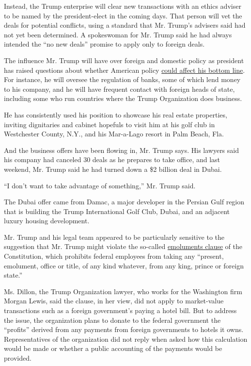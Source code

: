 Instead, the Trump enterprise will clear new transactions with an ethics
adviser to be named by the president-elect in the coming days. That
person will vet the deals for potential conflicts, using a standard that
Mr. Trump's advisers said had not yet been determined. A spokeswoman for
Mr. Trump said he had always intended the ``no new deals'' promise to
apply only to foreign deals.

The influence Mr. Trump will have over foreign and domestic policy as
president has raised questions about whether American policy
\href{http://www.nytimes.com/interactive/2016/12/01/us/politics/trump-conflict-of-interests.html}{could
affect his bottom line}. For instance, he will oversee the regulation of
banks, some of which lend money to his company, and he will have
frequent contact with foreign heads of state, including some who run
countries where the Trump Organization does business.

He has consistently used his position to showcase his real estate
properties, inviting dignitaries and cabinet hopefuls to visit him at
his golf club in Westchester County, N.Y., and his Mar-a-Lago resort in
Palm Beach, Fla.

And the business offers have been flowing in, Mr. Trump says. His
lawyers said his company had canceled 30 deals as he prepares to take
office, and last weekend, Mr. Trump said he had turned down a \$2
billion deal in Dubai.

``I don't want to take advantage of something,'' Mr. Trump said.

The Dubai offer came from Damac, a major developer in the Persian Gulf
region that is building the Trump International Golf Club, Dubai, and an
adjacent luxury housing development.

Mr. Trump and his legal team appeared to be particularly sensitive to
the suggestion that Mr. Trump might violate the so-called
\href{https://www.nytimes.com/2016/11/21/us/politics/donald-trump-conflict-of-interest.html}{emoluments
clause} of the Constitution, which prohibits federal employees from
taking any ``present, emolument, office or title, of any kind whatever,
from any king, prince or foreign state.''

Ms. Dillon, the Trump Organization lawyer, who works for the Washington
firm Morgan Lewis, said the clause, in her view, did not apply to
market-value transactions such as a foreign government's paying a hotel
bill. But to address the issue, the organization plans to donate to the
federal government the ``profits'' derived from any payments from
foreign governments to hotels it owns. Representatives of the
organization did not reply when asked how this calculation would be made
or whether a public accounting of the payments would be provided.

